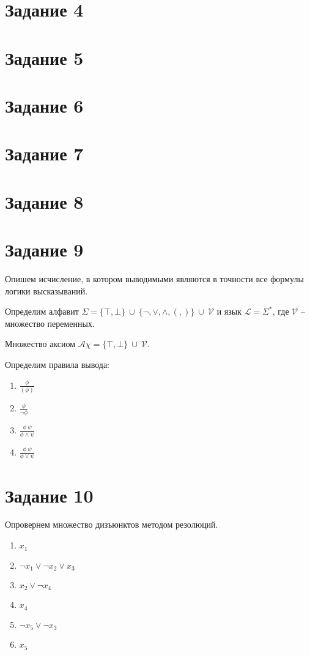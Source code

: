 \documentclass{article}
\begin{document}
\section*{Задание 4}

\section*{Задание 5}

\section*{Задание 6}

\section*{Задание 7}

\section*{Задание 8}

\section*{Задание 9}
Опишем исчисление, в котором выводимыми являются в точности все формулы логики
высказываний.

Определим алфавит 
\(\Sigma = \{\top, \bot\}\ \cup\ \{\neg, \lor, \land, (, )\}\ \cup\ \mathcal{V}\)
и язык
\(\mathcal{L} = \Sigma^*\), где \(\mathcal{V}\) -- множество переменных.

Множество аксиом \(\mathcal{A\chi} = \{\top, \bot\}\ \cup\ \mathcal{V}\).

Определим правила вывода:
\begin{enumerate}
    \item \(\frac{\phi}{(\phi)}\)
    \item \(\frac{\phi}{\neg \phi}\)
    \item \(\frac{\phi \ \psi}{\phi \land \psi}\)
    \item \(\frac{\phi \ \psi}{\phi \lor \psi}\)
\end{enumerate}

\section*{Задание 10}
Опровернем множество дизъюнктов методом резолюций.
\begin{enumerate}
    \item \(x_1\)
    \item \(\neg x_1 \lor \neg x_2 \lor x_3\)
    \item \(x_2 \lor \neg x_4\)
    \item \(x_4\)
    \item \(\neg x_5 \lor \neg x_3\)
    \item \(x_5\)
\end{enumerate}
\end{document}
